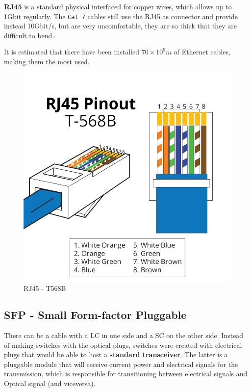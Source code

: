 \begin{paracol}{2}
   \colfill
   \textbf{RJ45} is a standard physical interfaced for copper wires, which allows up to 1Gbit regularly.
   The \texttt{Cat 7} cables still use the RJ45 as connector and provide instead 10Gbit/s, but are very uncomfortable, they are so thick that they are difficult to bend.
   
   It is estimated that there have been installed $70 \times 10^9m$ of Ethernet cables, making them the most used.
   \colfill
   \switchcolumn

   \begin{figure}[htbp]
      \centering
      \includegraphics{images/RJ45_T568B.jpg}
      \caption{RJ45 - T568B}
      \label{fig:RJ45_T568B}
   \end{figure}
\end{paracol}

\subsection{SFP - Small Form-factor Pluggable}
\label{sec:sfp}
There can be a cable with a LC in one side and a SC on the other side.
Instead of making switches with the optical plugs, switches were created with electrical plugs that would be able to host a \textbf{standard transceiver}.
The latter is a pluggable module that will receive current power and electrical signals for the transmission, which is responsible for transitioning between electrical signals and Optical signal (and viceversa).

